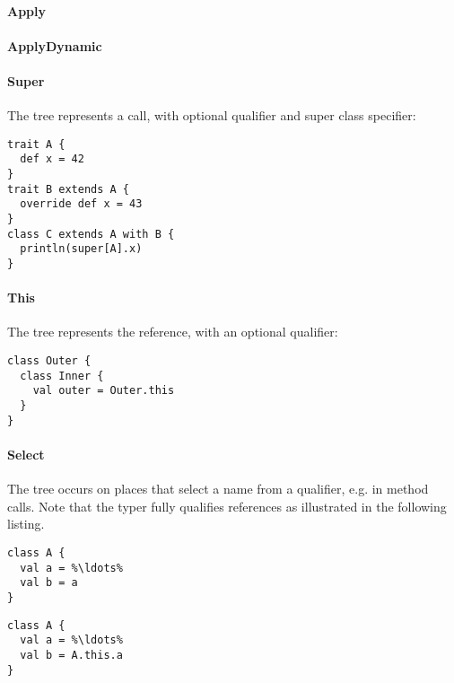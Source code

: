 \paragraph{Apply} 

\paragraph{ApplyDynamic} 

\paragraph{Super} 

\noindent The  tree represents a  call, with optional qualifier and super class specifier:

\begin{lstlisting}
trait A {
  def x = 42
}
trait B extends A {
  override def x = 43
}
class C extends A with B {
  println(super[A].x)
}
\end{lstlisting}

\paragraph{This} 

\noindent The  tree represents the  reference, with an optional qualifier:

\begin{lstlisting}
class Outer {
  class Inner {
    val outer = Outer.this
  }
}
\end{lstlisting}

\paragraph{Select} 

\noindent The  tree occurs on places that select a name from a qualifier, e.g. in method calls. Note that the typer fully qualifies references as illustrated in the following listing.

\begin{multicols}{2}
\begin{lstlisting}
class A {
  val a = %\ldots%
  val b = a
}
\end{lstlisting}
\begin{lstlisting}  
class A {
  val a = %\ldots%
  val b = A.this.a
}
\end{lstlisting}
\end{multicols}

